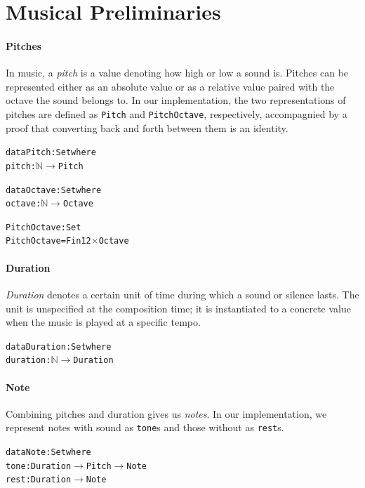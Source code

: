 \section{Musical Preliminaries}
\label{sec:music}

\paragraph{Pitches}
In music, a \emph{pitch} is a value denoting how high or low a sound is.
Pitches can be represented either as an absolute value or as a relative
value paired with the octave the sound belongs to.
In our implementation, the two representations of pitches are defined
as \texttt{Pitch} and \texttt{PitchOctave}, respectively, accompagnied
by a proof that converting back and forth between them is an identity.

\begin{alltt}
data Pitch : Set where
  pitch : \(\mathbb{N}\) \(\rightarrow\) Pitch

data Octave : Set where
  octave : \(\mathbb{N}\) \(\rightarrow\) Octave

PitchOctave : Set
PitchOctave = Fin 12 \(\times\) Octave
\end{alltt}

\paragraph{Duration}
\emph{Duration} denotes a certain unit of time during which a sound
or silence lasts.
The unit is unspecified at the composition time; it is instantiated to
a concrete value when the music is played at a specific tempo.

\begin{alltt}
data Duration : Set where
  duration : \(\mathbb{N}\) \(\rightarrow\) Duration
\end{alltt}

\paragraph{Note}
Combining pitches and duration gives us \emph{notes}.
In our implementation, we represent notes with sound as \texttt{tone}s
and those without as \texttt{rest}s.

\begin{alltt}
data Note : Set where
  tone : Duration \(\rightarrow\) Pitch \(\rightarrow\) Note
  rest : Duration         \(\rightarrow\) Note
\end{alltt}

